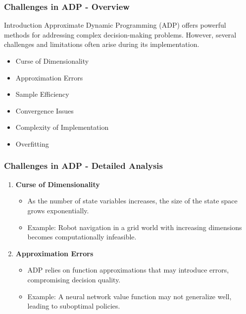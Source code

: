 \documentclass[aspectratio=169]{beamer}
\begin{document}
\begin{frame}[fragile]
    \frametitle{Challenges in ADP - Overview}
    \begin{block}{Introduction}
        Approximate Dynamic Programming (ADP) offers powerful methods for addressing complex decision-making problems. However, several challenges and limitations often arise during its implementation.
    \end{block}
    \begin{itemize}
        \item Curse of Dimensionality
        \item Approximation Errors
        \item Sample Efficiency
        \item Convergence Issues
        \item Complexity of Implementation
        \item Overfitting
    \end{itemize}
\end{frame}

\begin{frame}[fragile]
    \frametitle{Challenges in ADP - Detailed Analysis}
    \begin{enumerate}
        \item \textbf{Curse of Dimensionality}
        \begin{itemize}
            \item As the number of state variables increases, the size of the state space grows exponentially.
            \item Example: Robot navigation in a grid world with increasing dimensions becomes computationally infeasible.
        \end{itemize}

        \item \textbf{Approximation Errors}
        \begin{itemize}
            \item ADP relies on function approximations that may introduce errors, compromising decision quality.
            \item Example: A neural network value function may not generalize well, leading to suboptimal policies.
        \end{itemize}
    \end{enumerate}
\end{frame}
\end{document}
